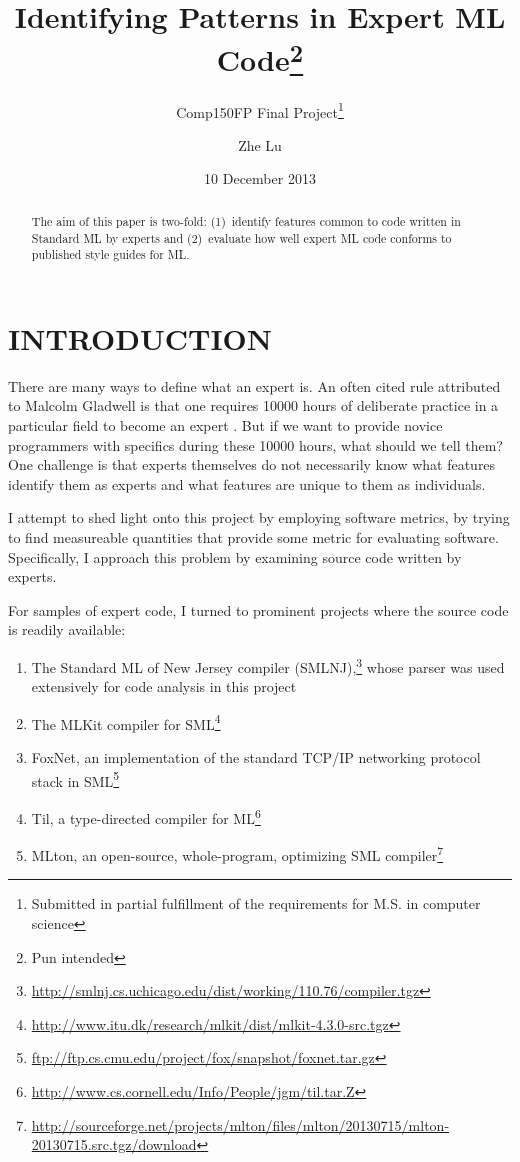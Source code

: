\documentclass[12pt,abstracton]{scrartcl}
\title{Identifying Patterns in Expert ML Code\footnote{Pun intended}}
\subtitle{Comp150FP Final Project\footnote{Submitted in partial fulfillment of the requirements for M.S. in computer science}}
\author{Zhe Lu}
\date{10 December 2013}
\begin{document}


\maketitle
\begin{abstract}
The aim of this paper is two-fold: (1)~identify features common to code written in Standard ML by experts and
(2)~evaluate how well expert ML code conforms to published style guides for ML.
\end{abstract}
\section{INTRODUCTION}
There are many ways to define what an expert is.
An often cited rule attributed to Malcolm Gladwell is that one requires 10000 hours of deliberate practice
in a particular field to become an expert \cite{Gla08}. But if we want to provide novice programmers
with specifics during these 10000 hours, what should we tell them? One challenge is that experts themselves
do not necessarily know what features identify them as experts and what features are unique to them as individuals.

I attempt to shed light onto this project by employing software metrics, by trying to find measureable quantities
that provide some metric for evaluating software. Specifically,
I approach this problem by examining source code written by experts.

For samples of expert code, I turned to prominent projects where the source code is readily available:
\begin{enumerate}
\item The Standard ML of New Jersey compiler (SMLNJ),\footnote{\url{http://smlnj.cs.uchicago.edu/dist/working/110.76/compiler.tgz}} whose parser was used extensively for code analysis in this project
\item The MLKit compiler for SML\footnote{\url{http://www.itu.dk/research/mlkit/dist/mlkit-4.3.0-src.tgz}}
\item FoxNet, an implementation of the standard TCP/IP networking protocol stack in SML\footnote{\url{ftp://ftp.cs.cmu.edu/project/fox/snapshot/foxnet.tar.gz}}
\item Til, a type-directed compiler for ML\footnote{\url{http://www.cs.cornell.edu/Info/People/jgm/til.tar.Z}}
\item MLton, an open-source, whole-program, optimizing SML compiler\footnote{\url{http://sourceforge.net/projects/mlton/files/mlton/20130715/mlton-20130715.src.tgz/download}}
\end{enumerate}
\end{document}
